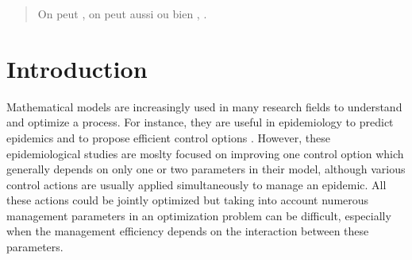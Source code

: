 
\author{Victor Picheny         \and
        Coralie Picard        \and
        Gael Thebaud
}



\date{Received: date / Accepted: date}

\maketitle


\begin{abstract}
On peut  , on peut aussi  ou bien , .
\end{abstract}

\section{Introduction}

Mathematical models are increasingly used in many research fields to understand and optimize a process. For instance, 
they are useful in epidemiology to predict epidemics and to propose efficient control options 
\cite{cunniffe2015thirteen,cunniffe2016modeling,mushayabasa2015modeling,tildesley2006optimal,bajardi2012optimizing,kompas2017optimal,vanderwaal2017optimal,grechi2012designing}.
However, these epidemiological studies are moslty focused on improving one control option which generally depends on only one or two parameters in their model, 
although various control actions are usually applied simultaneously to manage an epidemic. All these actions could be jointly optimized but taking into account numerous management parameters in an optimization problem can be difficult,
especially when the management efficiency depends on the interaction between these parameters.

